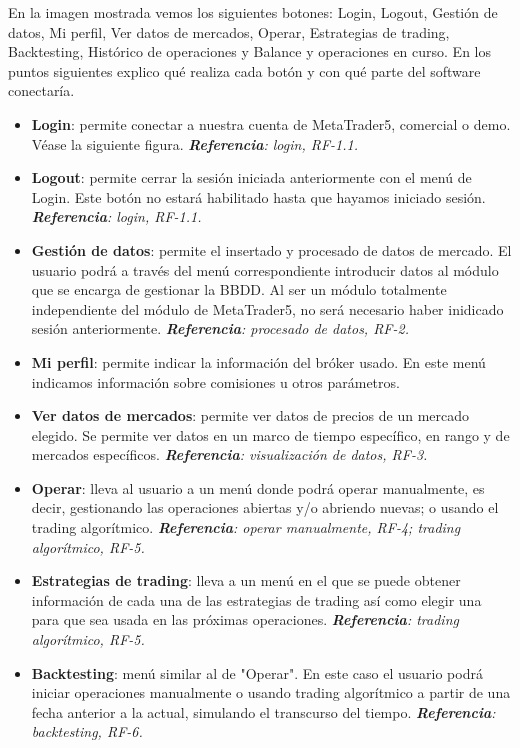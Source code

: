 \begin{titlepage}
En la imagen mostrada vemos los siguientes botones: Login, Logout, Gestión de datos, Mi perfil, Ver datos de mercados, Operar, Estrategias de trading, Backtesting, Histórico de operaciones y Balance y operaciones en curso. En los puntos siguientes explico qué realiza cada botón y con qué parte del software conectaría.\newline

\begin{itemize}
	\item \textbf{Login}: permite conectar a nuestra cuenta de MetaTrader5, comercial o demo. Véase la siguiente figura. \textit{\textbf{Referencia}: login, RF-1.1.}
	\item \textbf{Logout}: permite cerrar la sesión iniciada anteriormente con el menú de Login. Este botón no estará habilitado hasta que hayamos iniciado sesión. \textit{\textbf{Referencia}: login, RF-1.1.}
	\item \textbf{Gestión de datos}: permite el insertado y procesado de datos de mercado. El usuario podrá a través del menú correspondiente introducir datos al módulo que se encarga de gestionar la BBDD. Al ser un módulo totalmente independiente del módulo de MetaTrader5, no será necesario haber inidicado sesión anteriormente. \textit{\textbf{Referencia}: procesado de datos, RF-2.}
	\item \textbf{Mi perfil}: permite indicar la información del bróker usado. En este menú indicamos información sobre comisiones u otros parámetros.
	\item \textbf{Ver datos de mercados}: permite ver datos de precios de un mercado elegido. Se permite ver datos en un marco de tiempo específico, en rango y de mercados específicos. \textit{\textbf{Referencia}: visualización de datos, RF-3.}
	\item \textbf{Operar}: lleva al usuario a un menú donde podrá operar manualmente, es decir, gestionando las operaciones abiertas y/o abriendo nuevas; o usando el trading algorítmico. \textit{\textbf{Referencia}: operar manualmente, RF-4; trading algorítmico, RF-5.} 
	\item \textbf{Estrategias de trading}: lleva a un menú en el que se puede obtener información de cada una de las estrategias de trading así como elegir una para que sea usada en las próximas operaciones. \textit{\textbf{Referencia}: trading algorítmico, RF-5.} 
	\item \textbf{Backtesting}: menú similar al de "Operar". En este caso el usuario podrá iniciar operaciones manualmente o usando trading algorítmico a partir de una fecha anterior a la actual, simulando el transcurso del tiempo. \textit{\textbf{Referencia}: backtesting, RF-6.} 

\end{itemize}
\end{titlepage}
